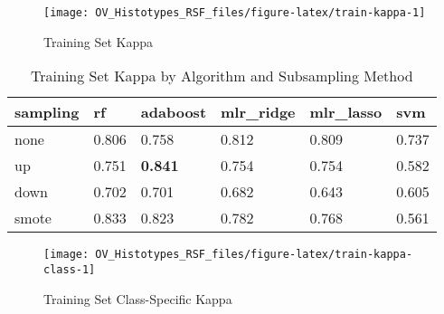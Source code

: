\documentclass[
]{report}
\begin{document}
\begin{figure}[H]

{\centering \texttt{[image: OV\_Histotypes\_RSF\_files/figure-latex/train-kappa-1]} 

}

\caption{Training Set Kappa}\label{fig:train-kappa}
\end{figure}

\begin{table}

\caption{\label{tab:train-kappa-table}Training Set Kappa by Algorithm and Subsampling Method}
\centering
\begin{tabular}[t]{l|l|l|l|l|l}
\hline
sampling & rf & adaboost & mlr\_ridge & mlr\_lasso & svm\\
\hline
none & 0.806 & 0.758 & 0.812 & 0.809 & 0.737\\
\hline
up & 0.751 & \textbf{0.841} & 0.754 & 0.754 & 0.582\\
\hline
down & 0.702 & 0.701 & 0.682 & 0.643 & 0.605\\
\hline
smote & 0.833 & 0.823 & 0.782 & 0.768 & 0.561\\
\hline
\end{tabular}
\end{table}

\begin{figure}[H]

{\centering \texttt{[image: OV\_Histotypes\_RSF\_files/figure-latex/train-kappa-class-1]} 

}

\caption{Training Set Class-Specific Kappa}\label{fig:train-kappa-class}
\end{figure}
\end{document}
